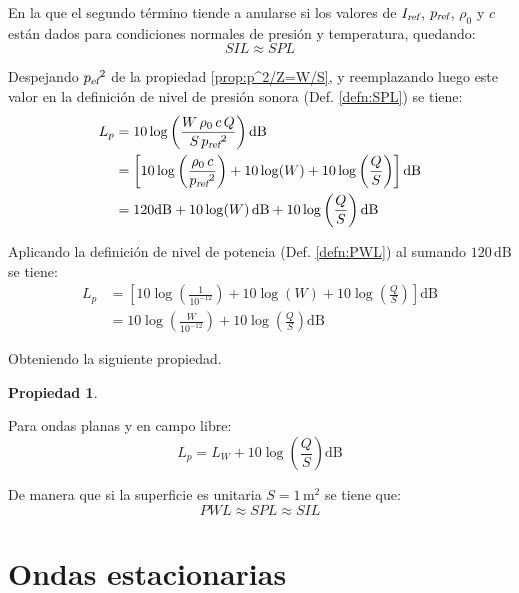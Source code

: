 \documentclass[a5paper,12pt,twoside]{book}
\newtheorem{prop}{{Propiedad}}[chapter]
\begin{document}
En la que el segundo término tiende a anularse si los valores de ${{I}_\textsl{{ref}}}$, ${{p}_\textsl{{ref}}}$, $\rho_0$ y $c$ están dados para condiciones normales de presión y temperatura, quedando:
\begin{equation*}
    SIL \approx SPL
\end{equation*}

Despejando ${{{p}_\textsl{{ef}}}}^2$ de la propiedad \ref{prop:p^2/Z=W/S}, y reemplazando luego este valor en la definición de nivel de presión sonora (Def. \ref{defn:SPL}) se tiene:
\begin{align*}
    L_p &= 10 \log \left( \frac{W \, \rho_0 \, c \, Q}{S \, \sub{p}{ref}^2} \right) \si{\deci\bel}
    \\
    &= \left[ 10\log \left( \frac{\rho_0 \, c}{\sub{p}{ref}^2} \right) + 10\log(W) + 10\log \left( \frac{Q}{S} \right) \right] \si{\deci\bel}
    \\
    &= 120 \si{\deci\bel} + 10 \log(W)\,\si{\deci\bel} + 10 \log \left( \frac{Q}{S} \right) \si{\deci\bel}
\end{align*}

Aplicando la definición de nivel de potencia (Def. \ref{defn:PWL}) al sumando $120\,\si{\deci\bel}$ se tiene:
\begin{align*}
    L_p &= \left[ 10 \log \left( \frac{1}{10^{-12}} \right) + 10 \log(W) + 10 \log \left( \frac{Q}{S} \right) \right] \si{\deci\bel}
    \\
    &= 10 \log \left( \frac{W}{10^{-12}} \right) + 10 \log \left( \frac{Q}{S} \right) \si{\deci\bel}
\end{align*}

Obteniendo la siguiente propiedad.

\begin{mdframed}[style=PropertyFrame]
    \begin{prop}
    \end{prop}
    Para ondas planas y en campo libre:
    \begin{equation*}
        L_p = L_W + 10 \log \left( \frac{Q}{S} \right) \si{\deci\bel}
    \end{equation*}
\end{mdframed}

De manera que si la superficie es unitaria $S=1\,\si{\metre^2}$ se tiene que:
\begin{equation*}
    PWL \approx SPL \approx SIL
\end{equation*}


\chapter{Ondas estacionarias}
\label{cha:standingWaves}
\end{document}
